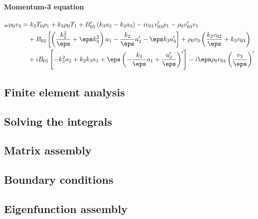 \paragraph{Momentum-3 equation}
\begin{equation}
  \begin{aligned}
    \omega \rho_0 v_3 &=
      k_3 T_0 \rho_1
      + k_3 \rho_0 T_1
		  + B_{03}' \left(k_3 a_2  - k_2 a_3\right)
      - iv_{01} v_{03}' \rho_1
      - \rho_0 v_{03}'v_1 \\
      &\quad
		  + B_{02} \left[
        \left(\frac{k_2^2}{\eps} + \eps k_3^2\right)a_1  - \frac{k_2}{\eps}a_2'  - \eps k_3 a_3'
      \right]
      + \rho_0 v_3 \left(\frac{k_2 v_{02}}{\eps} + k_3 v_{03}\right) \\
		&\quad
    + i B_{01} \left[-k_3^2 a_2  + k_2 k_3 a_3  + \eps\left(- \frac{k_2}{\eps}a_1 + \frac{a_2'}{\eps}\right)'\right]
    - i \eps \rho_0 v_{01} \left(\frac{v_3}{\eps}\right)'
  \end{aligned}
\end{equation}


\subsection{Finite element analysis} \label{ss: finite_elements}
\subsection{Solving the integrals} \label{ss: solving_integrals}
\subsection{Matrix assembly}
\subsection{Boundary conditions}
\subsection{Eigenfunction assembly}


\cleardoublepage
